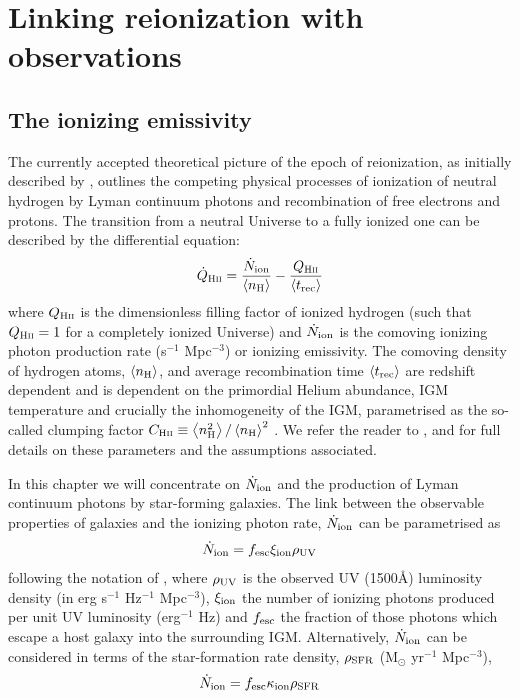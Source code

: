 \section{Linking reionization with observations}\label{sec:link}
\subsection{The ionizing emissivity}
The currently accepted theoretical picture of the epoch of reionization, as initially described by \citet{Madau:1999kl}, outlines the competing physical processes of ionization of neutral hydrogen by Lyman continuum photons and recombination of free electrons and protons. The transition from a neutral Universe to a fully ionized one can be described by the differential equation:
\begin{equation}
\dot{Q}_\textsc{Hii} = \frac{\dot{N}_{\rm{ion}}}{\left \langle n_{\textsc{H}} \right \rangle} - \frac{{Q}_\textsc{Hii}}{\left \langle t_{\rm{rec}} \right \rangle}
\end{equation}
\noindent where ${Q}_\textsc{Hii}$ is the dimensionless filling factor of ionized hydrogen (such that ${Q}_\textsc{Hii} = 1$ for a completely ionized Universe) and $\dot{N}_{\rm{ion}}$ is the comoving ionizing photon production rate (s$^{-1}$ Mpc$^{-3}$) or ionizing emissivity. The comoving density of hydrogen atoms, $\left \langle n_{\textsc{H}} \right \rangle$, and average recombination time $\left \langle t_{\rm{rec}} \right \rangle$ are redshift dependent and is dependent on the primordial Helium abundance, IGM temperature and crucially the inhomogeneity of the IGM, parametrised as the so-called clumping factor $C_{\textsc{Hii}} \equiv \left \langle n^{2}_{\textsc{H}} \right \rangle / \left \langle n_{\textsc{H}} \right \rangle^{2}$ \citep{Pawlik:2009id}. We refer the reader to \citet{Madau:1999kl}, \citet{Kuhlen:2012ka} and \citet{2010Natur.468...49R,Robertson:2013ji} for full details on these parameters and the assumptions associated. 

In this chapter we will concentrate on $\dot{N}_{\rm{ion}}$ and the production of Lyman continuum photons by star-forming galaxies. The link between the observable properties of galaxies and the ionizing photon rate, $\dot{N}_{\rm{ion}}$ can be parametrised as
\begin{equation}\label{eq:Nion_UV}
\dot{N}_{\rm{ion}} = f_{\rm{esc}}\xi_{\rm{ion}}\rho_{\rm{UV}}
\end{equation}
\noindent following the notation of \cite{Robertson:2013ji}, where $\rho_{\rm{UV}}$ is the observed UV (1500\AA) luminosity density (in erg s$^{-1}$ Hz$^{-1}$ Mpc$^{-3}$), $\xi_{\rm{ion}}$ the number of ionizing photons produced per unit UV luminosity (erg$^{-1}$ Hz) and $f_{\rm{esc}}$ the fraction of those photons which escape a host galaxy into the surrounding IGM. Alternatively, $\dot{N}_{\rm{ion}}$ can be considered in terms of the star-formation rate density, $\rho_{\rm{SFR}}$ (M$_{\odot}$ yr$^{-1}$ Mpc$^{-3}$),
\begin{equation}\label{eq:Nion_SFR}
    \dot{N}_{\rm{ion}} = f_{\rm{esc}} \kappa_{\rm{ion}} \rho_{\rm{SFR}}
\end{equation}

